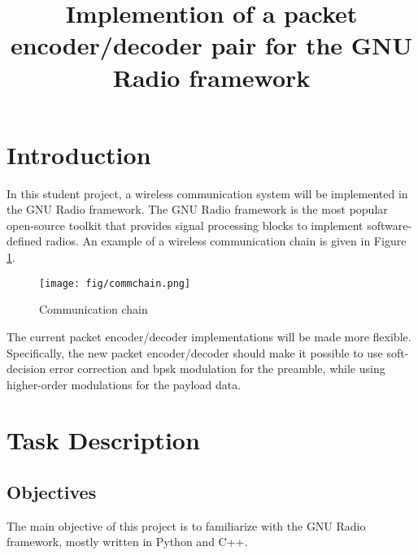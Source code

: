 \documentclass[12pt,english]{TCLsem}
\begin{document}



\title{Implemention of a packet encoder/decoder pair for the GNU Radio framework }




\maketitle


\section{Introduction}
In this student project, a wireless communication system will be implemented in the GNU Radio framework. The GNU Radio framework is the most popular open-source toolkit that provides signal processing blocks to implement software-defined radios. An example of a wireless communication chain is given in Figure \ref{fcommchain}.

\begin{figure}[H]
\hspace*{-1cm}
\begin{center}
\texttt{[image: fig/commchain.png]}
\end{center} 
\caption{Communication chain}
\label{fcommchain}
\end{figure}

The current packet encoder/decoder implementations will be made more flexible. Specifically, the new packet encoder/decoder should make it possible to use soft-decision error correction and \gls{bpsk} modulation for the preamble, while using higher-order modulations for the payload data.

\section{Task Description} 
\subsection{Objectives}
The main objective of this project is to familiarize with the GNU Radio framework, mostly written in Python and C++. \\ 
\end{document}
